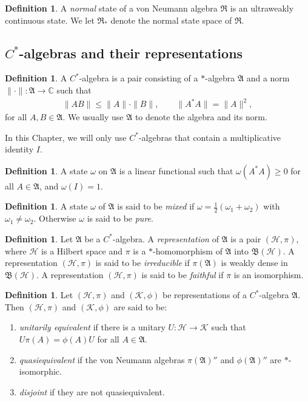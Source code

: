 \documentclass[11pt]{article}
\newcommand{\alg}[1]{\mathfrak{#1}}
\newcommand{\norm}[1]{\| #1\|}
\newcommand{\bh}{\mathfrak{B}(\mathcal{H})}
\theoremstyle{definition}
\theoremstyle{definition}
\newtheorem{defn}[thm]{Definition}
\theoremstyle{remark}
\def\2#1{{\mathcal #1}}
\def\7#1{{\mathbb #1}}
\def\al#1{{\mathfrak #1}}
\def\om{\omega} \def\Om{\Omega} \def\dd{\partial} \def\D{\Delta}
\begin{document}
\begin{defn} A \emph{normal} state of a von Neumann algebra $\alg{R}$
  is an ultraweakly continuous state.  We let $\al R_*$ denote the
  normal state space of $\al R$.  \end{defn}


\subsection{$C^*$-algebras and their representations}

\begin{defn} A $C^*$-algebra is a pair consisting of a $*$-algebra
  $\al A$ and a norm $\norm{\cdot}:\al A\to \7C$ such that
  \begin{eqnarray*}
    \norm{AB}\leq \norm{A}\cdot \norm{B} ,\qquad \norm{A^*A}=\norm{A}^2
    ,\end{eqnarray*} 
  for all $A,B\in \alg{A}$.  We usually use $\al A$ to denote the
  algebra and its norm.    
\end{defn}

In this Chapter, we will only use $C^*$-algebras that contain a
multiplicative identity $I$.

\begin{defn} A state $\om$ on $\alg{A}$ is a linear functional such
  that $\om (A^*A)\geq 0$ for all $A\in \alg{A}$, and $\om (I)=1$.
\end{defn}

\begin{defn} A state $\om$ of $\alg{A}$ is said to be \emph{mixed} if
  $\om =\frac{1}{2}(\om _1+\om _2)$ with $\om _1\neq \om _2$.
  Otherwise $\om$ is said to be \emph{pure}.  \end{defn}

\begin{defn} Let $\alg{A}$ be a $C^*$-algebra.  A
  \emph{representation} of $\alg{A}$ is a pair $(\2H ,\pi )$, where
  $\2H$ is a Hilbert space and $\pi$ is a $*$-homomorphism of
  $\alg{A}$ into $\bh$.  A representation $(\2H ,\pi )$ is said to be
  \emph{irreducible} if $\pi (\alg{A})$ is weakly dense in $\bh$.  A
  representation $(\2H ,\pi )$ is said to be \emph{faithful} if $\pi$
  is an isomorphism.  \end{defn}

\begin{defn} Let $(\2H ,\pi )$ and $(\2K ,\phi )$ be representations
  of a $C^*$-algebra $\alg{A}$.  Then $(\2H ,\pi )$ and $(\2K ,\phi )$
  are said to be:
  \begin{enumerate}
  \item \emph{unitarily equivalent} if there is a unitary $U:\2H \to
    \2K$ such that $U\pi (A)=\phi (A)U$ for all $A\in \alg{A}$.
  \item \emph{quasiequivalent} if the von Neumann algebras $\pi
    (\alg{A})''$ and $\phi (\alg{A})''$ are $*$-isomorphic.
  \item \emph{disjoint} if they are not quasiequivalent.
  \end{enumerate} \label{reps}
\end{defn}
\end{document}
